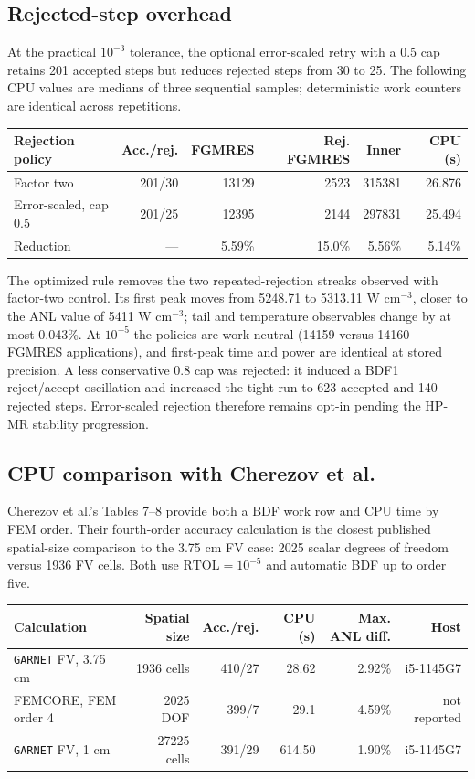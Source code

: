 \documentclass[10pt]{article}
\newcommand{\garnet}{\texttt{GARNET}}
\begin{document}
\subsection{Rejected-step overhead}

At the practical $10^{-3}$ tolerance, the optional error-scaled retry with a
0.5 cap retains 201 accepted steps but reduces rejected steps from 30 to 25.
The following CPU values are medians of three sequential samples; deterministic
work counters are identical across repetitions.

\begin{center}
\small
\begin{tabular}{|l|r|r|r|r|r|}
\hline
Rejection policy & Acc./rej. & FGMRES & Rej. FGMRES & Inner & CPU (s) \\
\hline
Factor two & 201/30 & 13129 & 2523 & 315381 & 26.876 \\
Error-scaled, cap 0.5 & 201/25 & 12395 & 2144 & 297831 & 25.494 \\
\hline
Reduction & --- & 5.59\% & 15.0\% & 5.56\% & 5.14\% \\
\hline
\end{tabular}
\end{center}

The optimized rule removes the two repeated-rejection streaks observed with
factor-two control. Its first peak moves from 5248.71 to
5313.11 W cm$^{-3}$, closer to the ANL value of 5411 W cm$^{-3}$; tail and
temperature observables change by at most 0.043\%. At $10^{-5}$ the policies
are work-neutral (14159 versus 14160 FGMRES applications), and first-peak time
and power are identical at stored precision. A less conservative 0.8 cap was
rejected: it induced a BDF1 reject/accept oscillation and increased the tight
run to 623 accepted and 140 rejected steps. Error-scaled rejection therefore
remains opt-in pending the HP-MR stability progression.

\subsection{CPU comparison with Cherezov et al.}

Cherezov et al.'s Tables 7--8 provide both a BDF work row and CPU time by FEM
order. Their fourth-order accuracy calculation is the closest published
spatial-size comparison to the 3.75 cm FV case: 2025 scalar degrees of freedom
versus 1936 FV cells. Both use $\mathrm{RTOL}=10^{-5}$ and automatic BDF up to
order five.

\begin{center}
\small
\begin{tabular}{|l|r|r|r|r|r|}
\hline
Calculation & Spatial size & Acc./rej. & CPU (s) & Max. ANL diff. & Host \\
\hline
\garnet{} FV, 3.75 cm & 1936 cells & 410/27 & 28.62 & 2.92\% & i5-1145G7 \\
FEMCORE, FEM order 4 & 2025 DOF & 399/7 & 29.1 & 4.59\% & not reported \\
\garnet{} FV, 1 cm & 27225 cells & 391/29 & 614.50 & 1.90\% & i5-1145G7 \\
\hline
\end{tabular}
\end{center}
\end{document}
